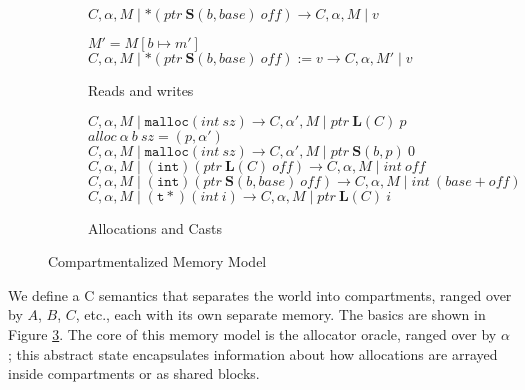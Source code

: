 \documentclass{article}
\begin{document}
\begin{figure}
\begin{subfigure}{0.55\textwidth}
             {\(C, \alpha, M \mid *(\mathit{ptr} ~ \mathbf{S}(b, \mathit{base}) ~ \mathit{off})
               \longrightarrow C, \alpha, M \mid v\)}

                {\(M' = M[b \mapsto m']\)}
                {\(C, \alpha, M \mid *(\mathit{ptr} ~ \mathbf{S}(b, \mathit{base}) ~ \mathit{off}) := v
                  \longrightarrow C, \alpha, M' \mid v\)}

    \caption{Reads and writes}
    \label{subfig:rnw}
  \end{subfigure}
  \begin{subfigure}{\textwidth}
             {\(C, \alpha, M \mid \mathtt{malloc}(\mathit{int} ~ sz) \longrightarrow
               C, \alpha', M \mid \mathit{ptr} ~ \mathbf{L}(C) ~ p\)}
                {\(\mathit{alloc} ~ \alpha ~ b ~ sz = (p, \alpha')\)}
                {\(C, \alpha, M \mid \mathtt{malloc}(\mathit{int} ~ sz) \longrightarrow
                  C, \alpha', M \mid \mathit{ptr} ~ \mathbf{S}(b,p) ~ 0\)}
    \judgment{}
             {\(C,\alpha,M \mid \mathtt{(int)}
               (\mathit{ptr} ~ \mathbf{L}(C) ~ \mathit{off})
               \longrightarrow C,\alpha,M \mid \mathit{int} ~ \mathit{off}\)}
    \judgment{}
             {\(C,\alpha,M \mid \mathtt{(int)}
               (\mathit{ptr} ~ \mathbf{S}(b,\mathit{base}) ~ \mathit{off})
               \longrightarrow C,\alpha,M \mid \mathit{int} ~ (\mathit{base}+\mathit{off})\)}
    \judgment{}
             {\(C,\alpha,M \mid \mathtt{(t*)} (\mathit{int} ~ i) \longrightarrow
               C,\alpha,M \mid \mathit{ptr} ~ \mathbf{L}(C) ~ \mathit{i}\)}

    \caption{Allocations and Casts}
    \label{subfig:allocs}
  \end{subfigure}

  \caption{Compartmentalized Memory Model}
  \label{fig:memmod}
\end{figure}

We define a C semantics that separates the world into compartments, ranged over by
\(A\), \(B\), \(C\), etc., each with its own separate memory. The basics are shown in
Figure \ref{fig:memmod}. The core of this memory model is the allocator oracle, ranged
over by \(\alpha\); this abstract state encapsulates information about how allocations
are arrayed inside compartments or as shared blocks.
\end{document}
